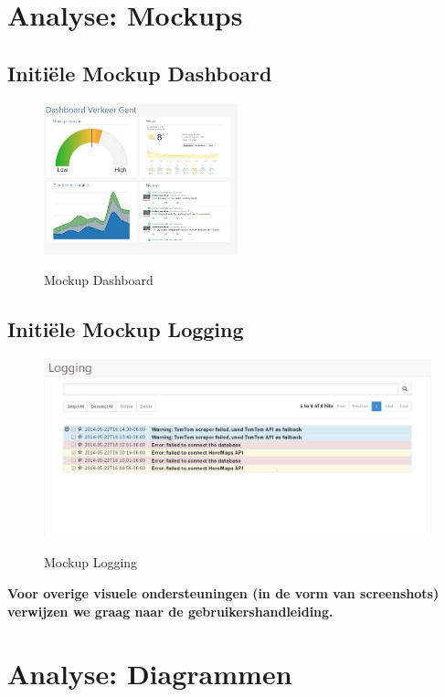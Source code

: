 \documentclass[a4paper]{article}
\begin{document}
\newpage

\section{Analyse: Mockups}

\subsection{Initiële Mockup Dashboard}
\begin{figure}[H]
\centering
\includegraphics[width=0.5\textwidth]{images/mockupdashboard.png}\\
\caption{Mockup Dashboard}
\end{figure}

\subsection{Initiële Mockup Logging}
\begin{figure}[H]
\centering
\includegraphics[width=\textwidth]{images/mockuplogging.png}\\
\caption{Mockup Logging}
\end{figure}

\textbf{Voor overige visuele ondersteuningen (in de vorm van screenshots) verwijzen we graag naar de gebruikershandleiding.}

\section{Analyse: Diagrammen}
\end{document}
